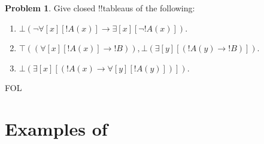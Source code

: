 \documentclass[10pt,a4paper]{article}
\theoremstyle{plain}
\theoremstyle{definition}
\newtheorem{prob}{Problem}[section]
\theoremstyle{remark}
\newcommand*{\olfileid}[3]{}
\newcommand*{\olsection}[1]{\section*{#1}}
\providecommand{\lif}{\mathbin{\rightarrow}}
\providecommand{\lforall}{\mathord{\forall}}
\providecommand{\lexists}{\mathord{\exists}}
\providecommand{\sFmla}[2]{#1(#2)}
\providecommand{\True}{\top}
\providecommand{\False}{\bot}
\providecommand{\iftag}[1]{#1}
\providecommand{\iftag}{}
\begin{document}
\begin{prob}
Give closed !!{tableau}s of the following:
\begin{enumerate}
\item $\sFmla{\False}{\lnot\lforall[x][!A(x)] \lif \lexists[x][\lnot!A(x)]}$.
\item $\sFmla{\True}{(\lforall[x][!A(x)] \lif !B)}, \sFmla{\False}{\lexists[y][(!A(y) \lif !B)]}$.
\item $\sFmla{\False}{\lexists[x][(!A(x) \lif \lforall[y][!A(y)])]}$.
\end{enumerate}
\end{prob}





\iftag{FOL}
      {\olfileid{fol}{tab}{pro}}
      {\olfileid{pl}{tab}{pro}}

\olsection{Examples of }
\end{document}
